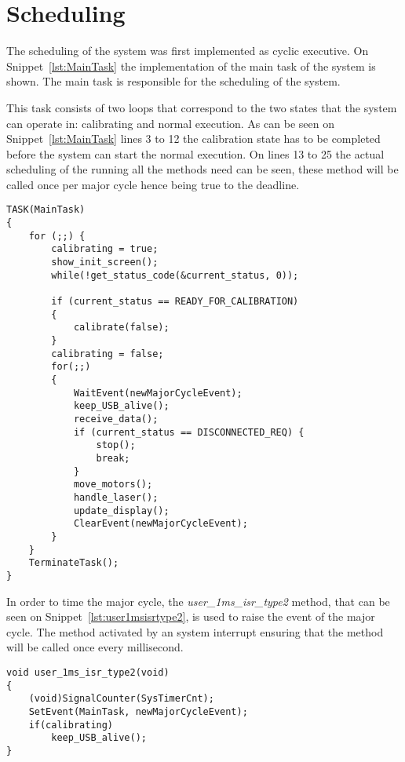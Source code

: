 \section{Scheduling}\label{solution:scheduling}
The scheduling of the system was first implemented as cyclic executive.
On Snippet~\ref{lst:MainTask} the implementation of the main task of the system is shown.
The main task is responsible for the scheduling of the system.

This task consists of two loops that correspond to the two states that the system can operate in: calibrating and normal execution.
As can be seen on Snippet~\ref{lst:MainTask} lines 3 to 12 the calibration state has to be completed before the system can start the normal execution.
On lines 13 to 25 the actual scheduling of the running all the methods need can be seen, these method will be called once per major cycle hence being true to the deadline.

\begin{lstlisting}[language=CSharp,label={lst:MainTask},caption={MainTaks method from logic.c}]
TASK(MainTask)
{
    for (;;) {
        calibrating = true;
        show_init_screen();
        while(!get_status_code(&current_status, 0));

        if (current_status == READY_FOR_CALIBRATION)
        {
            calibrate(false);
        }
        calibrating = false;
        for(;;)
        {
            WaitEvent(newMajorCycleEvent);
            keep_USB_alive();
            receive_data();
            if (current_status == DISCONNECTED_REQ) {
                stop();
                break;
            }
            move_motors();
            handle_laser();
            update_display();
            ClearEvent(newMajorCycleEvent);
        }
    }
    TerminateTask();
}
\end{lstlisting}

In order to time the major cycle, the \textit{user\_1ms\_isr\_type2} method, that can be seen on Snippet~\ref{lst:user1msisrtype2}, is used to raise the event of the major cycle.
The method activated by an system interrupt ensuring that the method will be called once every millisecond.
\begin{lstlisting}[language=CSharp,label={lst:user1msisrtype2},caption={user\_1ms\_isr\_type2 method from nxt.c}]
void user_1ms_isr_type2(void)
{
    (void)SignalCounter(SysTimerCnt);
    SetEvent(MainTask, newMajorCycleEvent);
    if(calibrating)
        keep_USB_alive();
}
\end{lstlisting}


